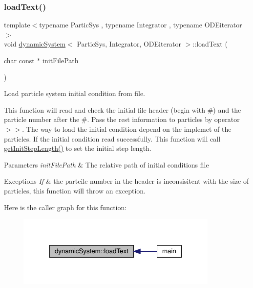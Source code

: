 \subsubsection{\texorpdfstring{load\+Text()}{loadText()}}
{\footnotesize\ttfamily template$<$typename Partic\+Sys , typename Integrator , typename O\+D\+Eiterator $>$ \\
void \mbox{\hyperlink{classdynamic_system}{dynamic\+System}}$<$ Partic\+Sys, Integrator, O\+D\+Eiterator $>$\+::load\+Text (\begin{DoxyParamCaption}\item[{char const $\ast$}]{init\+File\+Path }\end{DoxyParamCaption})}



Load particle system initial condition from file. 

This function will read and check the initial file header (begin with \textquotesingle{}\#\textquotesingle{}) and the particle number after the \textquotesingle{}\#\textquotesingle{}. Pass the rest information to particles by operator \textquotesingle{}$>$$>$\textquotesingle{}. The way to load the initial condition depend on the implemet of the particles. If the initial condition read successfully. This function will call \mbox{\hyperlink{classdynamic_system_a9009d61ca09844f016ebc0d87467dba3}{get\+Init\+Step\+Length()}} to set the initial step length.


\begin{DoxyParams}{Parameters}
{\em init\+File\+Path} & The relative path of initial conditions file \\
\hline
\end{DoxyParams}

\begin{DoxyExceptions}{Exceptions}
{\em If} & the partcile number in the header is inconsisitent with the size of particles, this function will throw an exception. \\
\hline
\end{DoxyExceptions}
Here is the caller graph for this function\+:
\nopagebreak
\begin{figure}[H]
\begin{center}
\leavevmode
\includegraphics[width=283pt]{classdynamic_system_a44849a58489dd8c300edc920f793c56a_icgraph}
\end{center}
\end{figure}
\mbox{\label{classdynamic_system_af1b1ccfa965c677bd66029b42377117d}} 

